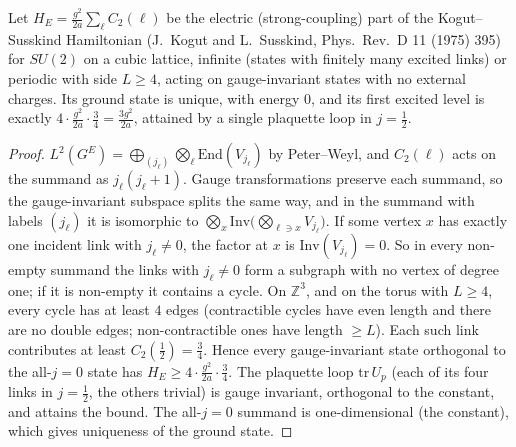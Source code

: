 \begin{proposition}\label{p1prop:electric}
 Let $H_E=\frac{g^2}{2a}\sum_\ell C_2(\ell)$ be the electric (strong-coupling) part of the
Kogut--Susskind Hamiltonian (J.~Kogut and L.~Susskind, Phys.\ Rev.\ D 11 (1975) 395) for $SU(2)$ on a cubic lattice,
infinite (states with finitely many excited links) or periodic with side $L\ge4$, acting on gauge-invariant states with no external charges. Its ground state is
unique, with energy $0$, and its first excited level is exactly $4\cdot\frac{g^2}{2a}\cdot\frac34=\frac{3g^2}{2a}$,
attained by a single plaquette loop in $j=\tfrac12$.
\end{proposition}
\begin{proof}
$L^2(G^E)=\bigoplus_{(j_\ell)}\bigotimes_\ell\mathrm{End}(V_{j_\ell})$ by Peter--Weyl, and $C_2(\ell)$ acts on the
summand as $j_\ell(j_\ell+1)$. Gauge transformations preserve each summand, so the gauge-invariant subspace splits the
same way, and in the summand with labels $(j_\ell)$ it is isomorphic to $\bigotimes_x\mathrm{Inv}\bigl(\bigotimes_{\ell\ni x}V_{j_\ell}\bigr)$.
If some vertex $x$ has exactly one incident link with $j_\ell\ne0$, the factor at $x$ is $\mathrm{Inv}(V_{j_\ell})=0$.
So in every non-empty summand the links with $j_\ell\ne0$ form a subgraph with no vertex of degree one; if it is
non-empty it contains a cycle. On $\mathbb{Z}^3$, and on the torus with $L\ge4$, every cycle has at least $4$ edges
(contractible cycles have even length and there are no double edges; non-contractible ones have length $\ge L$). Each
such link contributes at least $C_2(\tfrac12)=\tfrac34$. Hence every gauge-invariant state orthogonal to the all-$j=0$
state has $H_E\ge4\cdot\frac{g^2}{2a}\cdot\frac34$. The plaquette loop $\mathrm{tr}\,U_p$ (each of its four links in
$j=\tfrac12$, the others trivial) is gauge invariant, orthogonal to the constant, and attains the bound. The all-$j=0$
summand is one-dimensional (the constant), which gives uniqueness of the ground state.
\end{proof}

